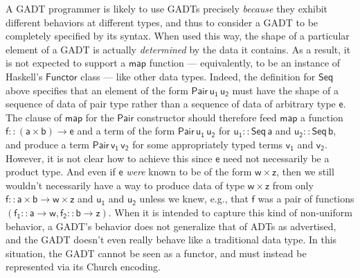 \documentclass[acmsmall,screen,review,anonymous]{acmart}
\theoremstyle{definition}
\begin{document}
A GADT programmer is likely to use GADTs precisely {\em because} they
exhibit different behaviors at different types, and thus to consider a
GADT to be completely specified by its syntax. When used this way, the
shape of a particular element of a GADT is actually {\em determined}
by the data it contains. As a result, it is not expected to support a
$\mathsf{map}$ function --- equivalently, to be an instance of
Haskell's $\mathsf{Functor}$ class --- like other data types. Indeed,
the definition for $\mathsf{Seq}$ above specifies that an element of
the form $\mathsf{Pair\,u_1\,u_2}$ must have the shape of a sequence
of data of pair type rather than a sequence of data of arbitrary type
$\mathsf{e}$.  The clause of $\mathsf{map}$ for the $\mathsf{Pair}$
constructor should therefore feed $\mathsf{map}$ a function $\mathsf{f
  :: (a \times b) \to e}$ and a term of the form $\mathsf{Pair
  \,u_1\,u_2}$ for $\mathsf{u_1 :: Seq\,a}$ and $\mathsf{u_2 ::
  Seq\,b}$, and produce a term $\mathsf{Pair\,v_1\,v_2}$ for some
appropriately typed terms $\mathsf{v_1}$ and $\mathsf{v_2}$. However,
it is not clear how to achieve this since $\mathsf{e}$ need not
necessarily be a product type. And even if $\mathsf{e}$ {\em were}
known to be of the form $\mathsf{w \times z}$, then we still wouldn't
necessarily have a way to produce data of type $\mathsf{w \times z}$
from only $\mathsf{f :: a \times b \to w \times z}$ and $\mathsf{u_1}$
and $\mathsf{u_2}$ unless we knew, e.g., that $\mathsf{f}$ was a pair
of functions $\mathsf{(f_1 :: a \to w, f_2 :: b \to z)}$. When it is
intended to capture this kind of non-uniform behavior, a GADT's
behavior does not generalize that of ADTs as advertised, and the GADT
doesn't even really behave like a traditional data type. In this
situation, the GADT cannot be seen as a functor, and must instead be
represented via its Church encoding.
\end{document}

